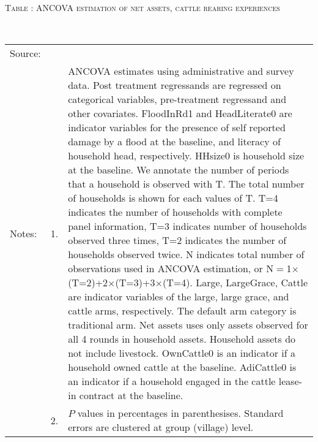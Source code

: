 \hspace{-1cm}\begin{minipage}[t]{14cm}
\hfil\textsc{\normalsize Table \thetable: ANCOVA estimation of net assets, cattle rearing experiences\label{tab ANCOVA net assets experience}}\\
\setlength{\tabcolsep}{1pt}
\setlength{\baselineskip}{8pt}
\renewcommand{\arraystretch}{.52}
\hfil{}\\
\renewcommand{\arraystretch}{.8}
\setlength{\tabcolsep}{1pt}
\begin{tabular}{>{\hfill\scriptsize}p{1cm}<{}>{\hfill\scriptsize}p{.25cm}<{}>{\scriptsize}p{12cm}<{\hfill}}
Source:& \multicolumn{2}{l}{\scriptsize Estimated with GUK administrative and survey data.}\\
Notes: & 1. & ANCOVA estimates using administrative and survey data. Post treatment regressands are regressed on categorical variables, pre-treatment regressand and other covariates. \textsf{FloodInRd1} and \textsf{HeadLiterate0} are indicator variables for the presence of self reported damage by a flood at the baseline, and literacy of household head, respectively. \textsf{HHsize0} is household size at the baseline. We annotate the number of periods that a household is observed with \textsf{T}. The total number of households is shown for each values of \textsf{T}. \textsf{T=4} indicates the number of households with complete panel information, \textsf{T=3} indicates number of households observed three times, \textsf{T=2} indicates the number of households observed twice. \textsf{N} indicates total number of observations used in ANCOVA estimation, or \textsf{N$=$1$\times$(T=2)+2$\times$(T=3)+3$\times$(T=4)}.  \textsf{Large}, \textsf{LargeGrace}, \textsf{Cattle} are indicator variables of the \textsf{large}, \textsf{large grace}, and \textsf{cattle} arms, respectively. The default arm category is \textsf{traditional} arm. Net assets uses only assets observed for all 4 rounds in household assets. Household assets do not include livestock. \textsf{OwnCattle0} is an indicator if a household owned cattle at the baseline. \textsf{AdiCattle0} is an indicator if a household engaged in the cattle lease-in contract at the baseline.  \\
& 2. & $P$ values in percentages in parenthesises. Standard errors are clustered at group (village) level.
\end{tabular}
\end{minipage}

